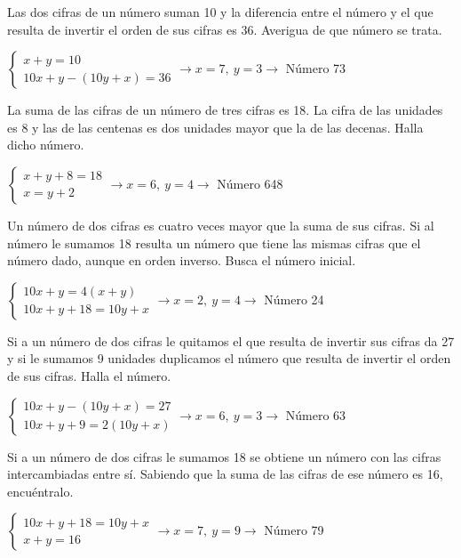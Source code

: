 \documentclass[spanish, 12pt]{exam}
\begin{document}
\begin{questions}
\question Las dos cifras de un número suman 10 y la diferencia entre el número y el que resulta de invertir el orden de sus cifras es 36. Averigua de que número se trata.

\begin{solution}  $\left\{\begin{matrix}x+y=10 \\ 10x+y-(10y+x)=36\end{matrix}\right. \to  x = 7, \  y = 3 \to$ Número 73\end{solution}

\question La suma de las cifras de un número de tres cifras es 18. La cifra de las unidades es 8 y las de las centenas es dos unidades mayor que la de las decenas. Halla dicho número. 
\begin{solution} $\left\{\begin{matrix}x+y+8=18 \\ x=y+2\end{matrix}\right. \to  x = 6, \  y = 4 \to$ Número 648 \end{solution}

\question Un número de dos cifras es cuatro veces mayor que la suma de sus cifras. Si al número le sumamos 18 resulta un número que tiene las mismas cifras que el número dado, aunque en orden inverso. Busca el número inicial.
\begin{solution} $\left\{\begin{matrix}10x+y=4(x+y) \\ 10x+y+18=10y+x\end{matrix}\right. \to  x = 2, \  y = 4 \to$ Número 24 \end{solution}

\question Si a un número de dos cifras le quitamos el que resulta de invertir sus cifras da 27 y si le sumamos 9 unidades duplicamos el número que resulta de invertir el orden de sus cifras. Halla el número.
\begin{solution} $\left\{\begin{matrix}10x+y-(10y+x)=27 \\ 10x+y+9=2(10y+x)\end{matrix}\right. \to  x = 6, \  y = 3 \to$ Número 63 \end{solution}

\question Si a un número de dos cifras le sumamos 18 se obtiene un número con las cifras intercambiadas entre sí. Sabiendo que la suma de las cifras de ese número es 16, encuéntralo.
\begin{solution} $\left\{\begin{matrix}10x+y+18=10y+x \\ x+y=16\end{matrix}\right. \to  x = 7, \  y = 9 \to$ Número 79 \end{solution}


\end{questions}
\end{document}

